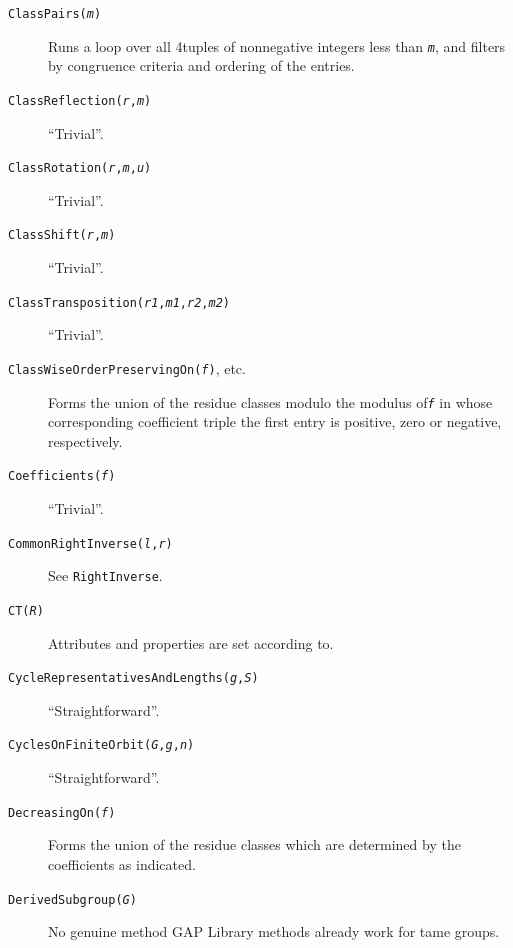\documentclass[a4paper,11pt]{report}
\begin{document}
{\begin{description}
\item[{ \texttt{ClassPairs(\mbox{\texttt{\mdseries\slshape m}})} }]  Runs a loop over all 4\texttt{}tuples of nonnegative integers less
than \mbox{\texttt{\mdseries\slshape m}}, and filters by congruence criteria and ordering of the entries. 
\item[{ \texttt{ClassReflection(\mbox{\texttt{\mdseries\slshape r}},\mbox{\texttt{\mdseries\slshape m}})} }]  ``Trivial''. 
\item[{ \texttt{ClassRotation(\mbox{\texttt{\mdseries\slshape r}},\mbox{\texttt{\mdseries\slshape m}},\mbox{\texttt{\mdseries\slshape u}})} }]  ``Trivial''. 
\item[{ \texttt{ClassShift(\mbox{\texttt{\mdseries\slshape r}},\mbox{\texttt{\mdseries\slshape m}})} }]  ``Trivial''. 
\item[{ \texttt{ClassTransposition(\mbox{\texttt{\mdseries\slshape r1}},\mbox{\texttt{\mdseries\slshape m1}},\mbox{\texttt{\mdseries\slshape r2}},\mbox{\texttt{\mdseries\slshape m2}})} }]  ``Trivial''. 
\item[{ \texttt{ClassWiseOrderPreservingOn(\mbox{\texttt{\mdseries\slshape f}})}, etc. }]  Forms the union of the residue classes modulo the modulus of{\nobreakspace}\mbox{\texttt{\mdseries\slshape f}} in whose corresponding coefficient triple the first entry is positive, zero or
negative, respectively. 
\item[{ \texttt{Coefficients(\mbox{\texttt{\mdseries\slshape f}})} }]  ``Trivial''. 
\item[{ \texttt{CommonRightInverse(\mbox{\texttt{\mdseries\slshape l}},\mbox{\texttt{\mdseries\slshape r}})} }]  See \texttt{RightInverse}. 
\item[{ \texttt{CT(\mbox{\texttt{\mdseries\slshape R}})} }]  Attributes and properties are set according to{\nobreakspace}\cite{Kohl09}. 
\item[{ \texttt{CycleRepresentativesAndLengths(\mbox{\texttt{\mdseries\slshape g}},\mbox{\texttt{\mdseries\slshape S}})} }]  ``Straightforward''. 
\item[{ \texttt{CyclesOnFiniteOrbit(\mbox{\texttt{\mdseries\slshape G}},\mbox{\texttt{\mdseries\slshape g}},\mbox{\texttt{\mdseries\slshape n}})} }]  ``Straightforward''. 
\item[{ \texttt{DecreasingOn(\mbox{\texttt{\mdseries\slshape f}})} }]  Forms the union of the residue classes which are determined by the
coefficients as indicated. 
\item[{ \texttt{DerivedSubgroup(\mbox{\texttt{\mdseries\slshape G}})} }]  No genuine method \texttt{}\texttt{} \textsf{GAP} Library methods already work for tame groups. 

\end{description}}
\end{document}
